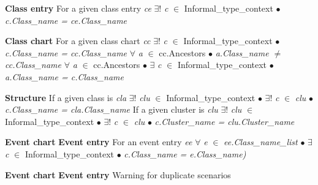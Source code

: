 \noindent\textbf{Class entry} \newline
\indent For a given class entry \textit{ce}\newline
\indent\indent $\exists !$  \textit{c} $\in$ Informal\_type\_context $\bullet$ \textit{c.Class\_name = ce.Class\_name}

\noindent\textbf{Class chart} \newline
\indent For a given class chart \textit{cc}\newline
\indent\indent $\exists !$  \textit{c} $\in$ Informal\_type\_context $\bullet$ \textit{c.Class\_name = cc.Class\_name}\newline
\indent\indent $\forall$ \textit{a} $\in$ cc.Ancestors $\bullet$ \textit{a.Class\_name $\neq$ cc.Class\_name}\newline
\indent\indent $\forall$ \textit{a} $\in$ cc.Ancestors $\bullet$ $\exists$ \textit{c} $\in$ Informal\_type\_context $\bullet$ \textit{a.Class\_name = c.Class\_name}

\noindent\textbf{Structure} \newline
\indent If a given class is \textit{cla}\newline
\indent\indent $\exists !$ \textit{clu} $\in$ Informal\_type\_context $\bullet$ $\exists !$ \textit{c} $\in$ \textit{clu} $\bullet$ \textit{c.Class\_name = cla.Class\_name}\newline
\indent If a given cluster is \textit{clu}\newline
\indent\indent $\exists !$ \textit{clu} $\in$ Informal\_type\_context $\bullet$ $\exists !$ \textit{c} $\in$ \textit{clu} $\bullet$ \textit{c.Cluster\_name = clu.Cluster\_name}

\noindent\textbf{Event chart}\newline
\indent \textbf{Event entry}\newline
\indent\indent For an event entry \textit{ee}\newline
\indent\indent\indent $\forall$ \textit{e} $\in$ \textit{ee.Class\_name\_list} $\bullet$ $\exists$ \textit{c} $\in$ Informal\_type\_context $\bullet$ \textit{c.Class\_name = e.Class\_name)}

\noindent\textbf{Event chart}\newline
\indent \textbf{Event entry}\newline
\indent\indent Warning for duplicate scenarios

